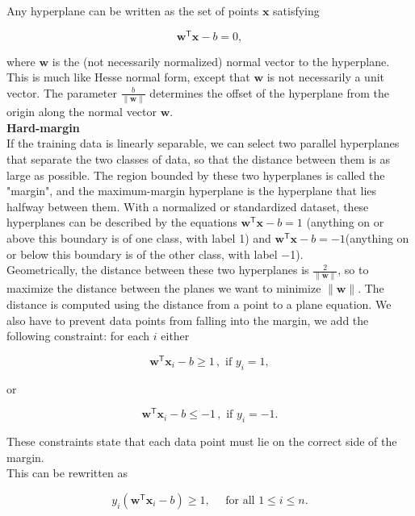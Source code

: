 Any hyperplane can be written as the set of points \(\mathbf{x}\) satisfying

\[\mathbf{w}^\mathsf{T} \mathbf{x} - b = 0,\]

where \(\mathbf{w}\) is the (not necessarily normalized) normal vector to the hyperplane. This is much like Hesse normal form, except that \(\mathbf{w}\) is not necessarily a unit vector. The parameter \(\tfrac{b}{\|\mathbf{w}\|}\) determines the offset of the hyperplane from the origin along the normal vector \(\mathbf{w}\).
\\

\textbf{Hard-margin} \\
If the training data is linearly separable, we can select two parallel hyperplanes that separate the two classes of data, so that the distance between them is as large as possible. The region bounded by these two hyperplanes is called the "margin", and the maximum-margin hyperplane is the hyperplane that lies halfway between them. With a normalized or standardized dataset, these hyperplanes can be described by the equations 
 \(\mathbf{w}^\mathsf{T} \mathbf{x} - b = 1\) (anything on or above this boundary is of one class, with label 1)
and 
\(\mathbf{w}^\mathsf{T} \mathbf{x} - b = -1\)(anything on or below this boundary is of the other class, with label −1).
\\

Geometrically, the distance between these two hyperplanes is \(\tfrac{2}{\|\mathbf{w}\|}\), so to maximize the distance between the planes we want to minimize \(\|\mathbf{w}\|\). The distance is computed using the distance from a point to a plane equation. We also have to prevent data points from falling into the margin, we add the following constraint: for each \(i\) either

\[\mathbf{w}^\mathsf{T} \mathbf{x}_i - b \ge 1 \, , \text{ if } y_i = 1,\]

or

\[\mathbf{w}^\mathsf{T} \mathbf{x}_i - b \le -1 \, , \text{ if } y_i = -1.\]

These constraints state that each data point must lie on the correct side of the margin.
\\

This can be rewritten as

\begin{equation}
    y_i(\mathbf{w}^\mathsf{T} \mathbf{x}_i - b) \ge 1, \quad \text{ for all } 1 \le i \le n.
\end{equation}

